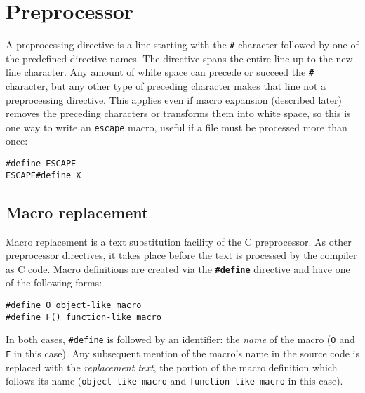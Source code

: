 \section{Preprocessor}

A preprocessing directive is a line starting with the \textbf{\texttt{\#}}
character followed by one of the predefined directive names.  The directive
spans the entire line up to the new-line character.  Any amount of white space
can precede or succeed the \textbf{\texttt{\#}} character, but any other type of
preceding character makes that line not a preprocessing directive.  This applies
even if macro expansion (described later) removes the preceding characters or
transforms them into white space, so this is one way to write an \texttt{escape}
macro, useful if a file must be processed more than once:

\begin{lstlisting}[style=c]
#define ESCAPE
ESCAPE#define X
\end{lstlisting}

\subsection{Macro replacement}

Macro replacement is a text substitution facility of the C preprocessor.  As
other preprocessor directives, it takes place before the text is processed by
the compiler as C code.  Macro definitions are created via the
\textbf{\texttt{\#define}} directive and have one of the following forms:

\begin{lstlisting}[style=c]
#define O object-like macro
#define F() function-like macro
\end{lstlisting}

In both cases, \texttt{\#define} is followed by an identifier: the \textit{name}
of the macro (\texttt{O} and \texttt{F} in this case).  Any subsequent mention
of the macro's name in the source code is replaced with the \textit{replacement
text}, the portion of the macro definition which follows its name
(\texttt{object-like macro} and \texttt{function-like macro} in this case).

